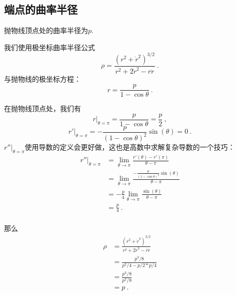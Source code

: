 \subsection{端点的曲率半径}
抛物线顶点处的曲率半径为$p$.

我们使用极坐标曲率半径公式
$$
\rho = \frac{(r^2 + \dot r^2)^{3/2}}{r^2 + 2\dot r^2 - r\ddot r}~.
$$
与抛物线的极坐标方程：
$$
r = \frac{p}{1 - \cos \theta }~.
$$

在抛物线顶点处，我们有
$$
r|_{\theta = \pi} = \frac{p}{1 - \cos \theta} = \frac{p}{2}~,
$$
$$
r' |_{\theta = \pi} = -\frac{p}{(1 - \cos \theta)^2} \sin(\theta) = 0~.
$$
$r'' |_{\theta = \pi}$使用导数的定义会更好做，这也是高数中求解复杂导数的一个技巧：
$$
\begin{aligned}
r''|_{\theta = \pi}  &= \lim_{\theta \to \pi} \frac{r'(\theta) - r'(\pi)}{\theta - \pi}\\
&=\lim_{\theta \to \pi} \frac{-\frac{p}{(1 - \cos \theta)^2} \sin(\theta)}{\theta - \pi}\\
&=-\frac{p}{4} \lim_{\theta \to \pi} \frac{\sin(\theta)}{\theta - \pi}\\
&=\frac{p}{4}~.\\
\end{aligned}
$$

那么
$$
\begin{aligned}
\rho &= \frac{(r^2 + \dot r^2)^{3/2}}{r^2 + 2\dot r^2 - r\ddot r}\\
&=\frac{p^3/8}{p^2/4 - p/2*p/4}\\
&=\frac{p^3/8}{p^2/8}\\
&=p~.\\
\end{aligned}
$$
